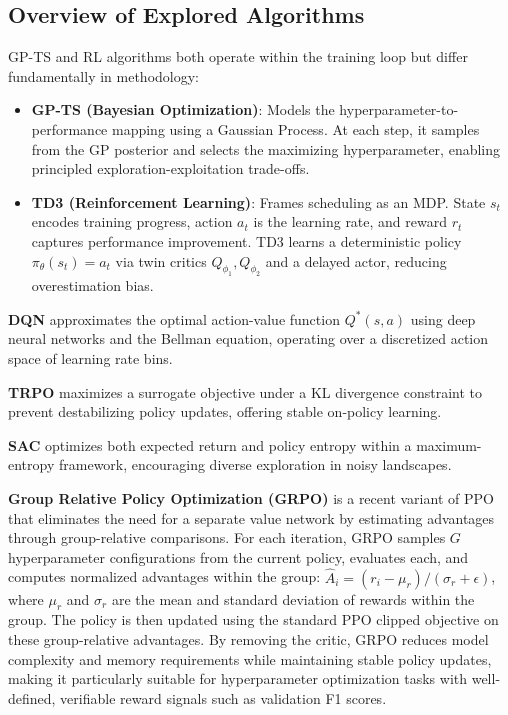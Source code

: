 \documentclass[11pt]{article}
\begin{document}
\subsection{Overview of Explored Algorithms}

GP-TS and RL algorithms both operate within the training loop but differ fundamentally in methodology:

\begin{itemize}
  \item \textbf{GP-TS (Bayesian Optimization)}: Models the hyperparameter-to-performance mapping using a Gaussian Process. At each step, it samples from the GP posterior and selects the maximizing hyperparameter, enabling principled exploration-exploitation trade-offs.

  \item \textbf{TD3 (Reinforcement Learning)}: Frames scheduling as an MDP. State $s_t$ encodes training progress, action $a_t$ is the learning rate, and reward $r_t$ captures performance improvement. TD3 learns a deterministic policy $\pi_\theta(s_t) = a_t$ via twin critics $Q_{\phi_1}, Q_{\phi_2}$ and a delayed actor, reducing overestimation bias.
\end{itemize}

\textbf{DQN} approximates the optimal action-value function $Q^*(s,a)$ using deep neural networks and the Bellman equation, operating over a discretized action space of learning rate bins.

\textbf{TRPO} maximizes a surrogate objective under a KL divergence constraint to prevent destabilizing policy updates, offering stable on-policy learning.

\textbf{SAC} optimizes both expected return and policy entropy within a maximum-entropy framework, encouraging diverse exploration in noisy landscapes.

\textbf{Group Relative Policy Optimization (GRPO)} is a recent variant of PPO that eliminates the need for a separate value network by estimating advantages through group-relative comparisons. For each iteration, GRPO samples $G$ hyperparameter configurations from the current policy, evaluates each, and computes normalized advantages within the group: $\hat{A}_i = (r_i - \mu_r) / (\sigma_r + \epsilon)$, where $\mu_r$ and $\sigma_r$ are the mean and standard deviation of rewards within the group. The policy is then updated using the standard PPO clipped objective on these group-relative advantages. By removing the critic, GRPO reduces model complexity and memory requirements while maintaining stable policy updates, making it particularly suitable for hyperparameter optimization tasks with well-defined, verifiable reward signals such as validation F1 scores.
\end{document}
